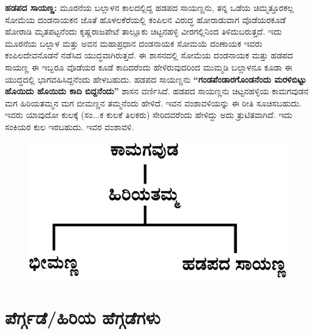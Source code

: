 \textbf{ಹಡಪದ ಸಾಯಣ್ಣ:} ಮೂರನೆಯ ಬಲ್ಲಾಳನ ಕಾಲದಲ್ಲಿದ್ದ ಹಡಪದ ಸಾಯಣ್ಣನು, ತನ್ನ ಒಡೆಯ ಚಿಮ್ಮತ್ತೂರಕಲ್ಲ ಸೋಮೆಯ ದಂಡನಾಯಕನ ಜೊತೆ ಹೊಳಲಕೆರೆಯಲ್ಲಿ ಕಂಪಿಲನ ವಿರುದ್ಧ ಹೋರಾಡುವಾಗ ವೊಡೆಯರಕೂಡೆ ಹೋರಾಡಿ ಮೃತಪಟ್ಟನೆಂದು ಕೃಷ್ಣರಾಜಪೇಟೆ ತಾಲ್ಲೂಕು ಚಿಟ್ಟನಹಳ್ಳಿ ವೀರಗಲ್ಲಿನಿಂದ ತಿಳಿದುಬರುತ್ತದೆ. ಇದು ಮೂರನೆಯ ಬಲ್ಲಾಳ ಮತ್ತು ಅವನ ಮಹಾಪ್ರಧಾನ ದಂಡನಾಯಕ ಸೋಮಯೆ ದಂಣಾಯಕ ಇವರು ಕಂಪಿಲದೇವನೊಡನೆ ನಡೆಸಿದ ಯುದ್ಧವಾಗಿರುತ್ತದೆ. ಈ ಶಾಸನದಲ್ಲಿ ಸೋಮೆಯ ದಂಡನಾಯಕ ಮತ್ತು ಹಡಪದ ಸಾಯಣ್ಣ ಈ ಇಬ್ಬರೂ ವೊಡೆಯರ ಕೂಡೆ ಕಾದಿದರೆಂದು ಹೇಳಿರುವುದರಿಂದ ಮುಮ್ಮಡಿ ಬಲ್ಲಾಳನೂ ಕೂಡಾ ಈ ಯುದ್ಧದಲ್ಲಿ ಭಾಗವಹಿಸಿದ್ದನೆಂದು ಹೇಳಬಹುದು. ಹಡಪದ ಸಾಯಣ್ಣನು \textbf{“ಗಂಡಪೆಂಡಾರಗೊಂಡನೆಂದು ಮರಳಿಬಿಟ್ಟು ಹೊಯಿದು ಹೊಯಿದು ಕಾದಿ ಬಿದ್ದನೆಂದು”} ಶಾಸನ ವರ್ಣಿಸಿದೆ. ಹಡಪದ ಸಾಯಣ್ಣನು ಚಿಟ್ಟನಹಳ್ಳಿಯ ಕಾಮಗವುಡನ ಮಗ ಹಿರಿಯತಮ್ಮನ ಮಗ ಬೀಮಣ್ಣನ ತಮ್ಮನೆಂದು ಹೇಳಿದೆ. ಇವನ ವಂಶಾವಳಿಯನ್ನು ಈ ರೀತಿ ಸೂಚಿಸಬಹುದು. ಇವರು ಯಾವುದೋ ಕುಲಕ್ಕೆ (ಸಂ...ಕ ಕುಲಕೆ ತಿಲಕರು) ಸೇರಿದವರೆಂದು ಹೇಳಿದ್ದು ಅದು ತ್ರುಟಿತವಾಗಿದೆ. ಇದು ಸಂಕಿಯರ ಕುಲ ಇರಬಹುದು. ಇವರ ವಂಶಾವಳಿ.

\begin{figure}[H]
\includegraphics[scale=1.2]{images/chap3/chap3fig34.jpeg}
\end{figure}


\section*{ಪೆರ್ಗ್ಗಡೆ/ಹಿರಿಯ ಹೆಗ್ಗಡೆಗಳು}

